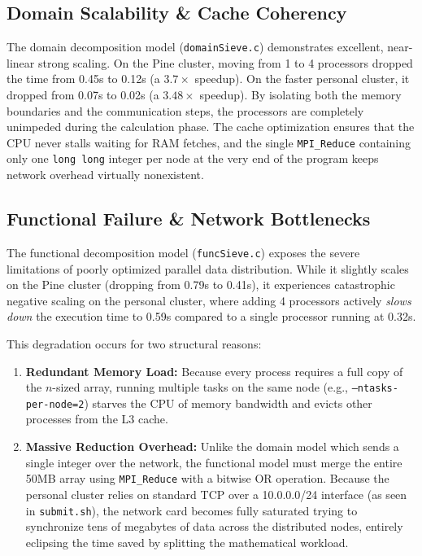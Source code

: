 \documentclass[11pt]{article}
\begin{document}
\subsection{Domain Scalability \& Cache Coherency}
The domain decomposition model (\texttt{domainSieve.c}) demonstrates excellent, near-linear strong scaling. On the Pine cluster, moving from 1 to 4 processors dropped the time from 0.45s to 0.12s (a $3.7\times$ speedup). On the faster personal cluster, it dropped from 0.07s to 0.02s (a $3.48\times$ speedup). By isolating both the memory boundaries and the communication steps, the processors are completely unimpeded during the calculation phase. The cache optimization ensures that the CPU never stalls waiting for RAM fetches, and the single \texttt{MPI\_Reduce} containing only one \texttt{long long} integer per node at the very end of the program keeps network overhead virtually nonexistent.

\subsection{Functional Failure \& Network Bottlenecks}
The functional decomposition model (\texttt{funcSieve.c}) exposes the severe limitations of poorly optimized parallel data distribution. While it slightly scales on the Pine cluster (dropping from 0.79s to 0.41s), it experiences catastrophic negative scaling on the personal cluster, where adding 4 processors actively \textit{slows down} the execution time to 0.59s compared to a single processor running at 0.32s.

This degradation occurs for two structural reasons:
\begin{enumerate}
  \item \textbf{Redundant Memory Load:} Because every process requires a full copy of the $n$-sized array, running multiple tasks on the same node (e.g., \texttt{--ntasks-per-node=2}) starves the CPU of memory bandwidth and evicts other processes from the L3 cache.
  \item \textbf{Massive Reduction Overhead:} Unlike the domain model which sends a single integer over the network, the functional model must merge the entire 50MB array using \texttt{MPI\_Reduce} with a bitwise OR operation. Because the personal cluster relies on standard TCP over a 10.0.0.0/24 interface (as seen in \texttt{submit.sh}), the network card becomes fully saturated trying to synchronize tens of megabytes of data across the distributed nodes, entirely eclipsing the time saved by splitting the mathematical workload.
\end{enumerate}
\end{document}
